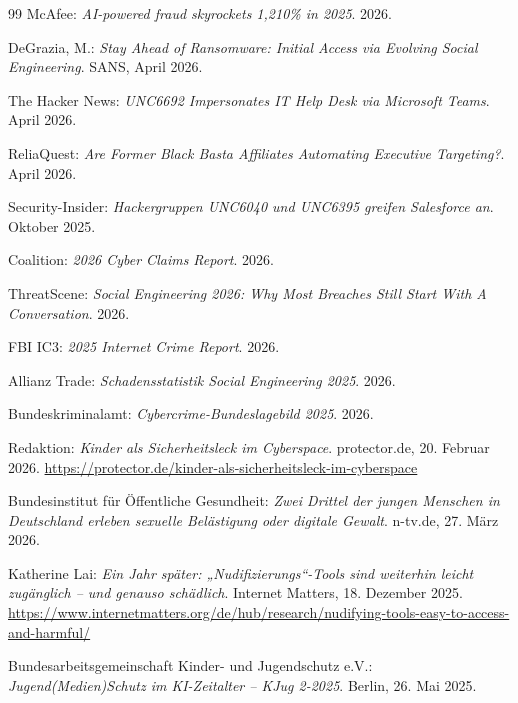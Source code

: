 \documentclass[10pt,a4paper]{article}
\begin{document}
\begin{thebibliography}{99}
		McAfee: \textit{AI-powered fraud skyrockets 1,210\% in 2025}. 2026.
		
		DeGrazia, M.: \textit{Stay Ahead of Ransomware: Initial Access via Evolving Social Engineering}. SANS, April 2026.
		
		The Hacker News: \textit{UNC6692 Impersonates IT Help Desk via Microsoft Teams}. April 2026.
		
		ReliaQuest: \textit{Are Former Black Basta Affiliates Automating Executive Targeting?}. April 2026.
		
		Security-Insider: \textit{Hackergruppen UNC6040 und UNC6395 greifen Salesforce an}. Oktober 2025.
		
		Coalition: \textit{2026 Cyber Claims Report}. 2026.
		
		ThreatScene: \textit{Social Engineering 2026: Why Most Breaches Still Start With A Conversation}. 2026.
		
		FBI IC3: \textit{2025 Internet Crime Report}. 2026.
		
		Allianz Trade: \textit{Schadensstatistik Social Engineering 2025}. 2026.
		
		Bundeskriminalamt: \textit{Cybercrime-Bundeslagebild 2025}. 2026.
		
		Redaktion: \textit{Kinder als Sicherheitsleck im Cyberspace}. protector.de, 20. Februar 2026. \url{https://protector.de/kinder-als-sicherheitsleck-im-cyberspace}
		
		Bundesinstitut für Öffentliche Gesundheit: \textit{Zwei Drittel der jungen Menschen in Deutschland erleben sexuelle Belästigung oder digitale Gewalt}. n-tv.de, 27. März 2026.
		
		Katherine Lai: \textit{Ein Jahr später: „Nudifizierungs“-Tools sind weiterhin leicht zugänglich – und genauso schädlich}. Internet Matters, 18. Dezember 2025. \url{https://www.internetmatters.org/de/hub/research/nudifying-tools-easy-to-access-and-harmful/}
		
		Bundesarbeitsgemeinschaft Kinder- und Jugendschutz e.V.: \textit{Jugend(Medien)Schutz im KI-Zeitalter – KJug 2-2025}. Berlin, 26. Mai 2025.
		

\end{thebibliography}
\end{document}

